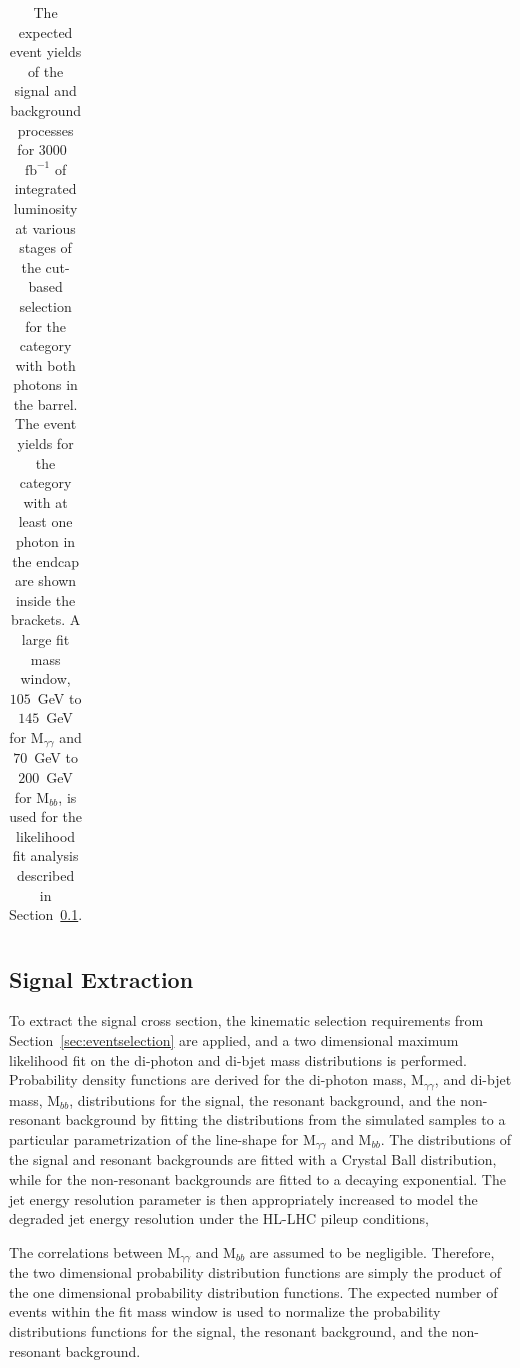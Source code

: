 \begin{table}[!ht]
\begin{center}
{\begin{tabular}{|c|c|c|c|c|c|}
\end{tabular}
}
\caption{ The expected event yields of the signal and background processes
for $3000$~$\mathrm{fb}^{-1}$ of integrated luminosity at various stages of the cut-based selection for 
the category with both photons in the barrel. The event yields for the category with at least one photon in the endcap are shown inside the brackets. A large fit mass
window, $105$~GeV to $145$~GeV for $\mathrm{M}_{\gamma\gamma}$ and $70$~GeV to $200$~GeV for $\mathrm{M}_{bb}$,
is used for the likelihood fit analysis described in Section~\ref{sec:signalextraction}. }
\label{tab:EventYields}
\end{center}
\end{table}


\subsection{Signal Extraction}
\label{sec:signalextraction}

To extract the signal cross section, the kinematic selection requirements from Section~\ref{sec:eventselection} are applied, and a two dimensional maximum
likelihood fit on the di-photon and di-bjet mass distributions is performed. Probability density functions are derived for the di-photon mass, $\mathrm{M}_{\gamma\gamma}$, and di-bjet mass, $\mathrm{M}_{bb}$,
distributions for the signal, the resonant background, and the non-resonant background by 
fitting the distributions from the simulated samples to a particular parametrization 
of the line-shape for $\mathrm{M}_{\gamma\gamma}$ and $\mathrm{M}_{bb}$. The distributions of the signal and resonant backgrounds are fitted with a Crystal Ball distribution, while for
the non-resonant backgrounds are fitted to a decaying exponential. The jet energy resolution parameter is then appropriately increased to model the degraded jet energy resolution under the HL-LHC pileup conditions,

The correlations between $\mathrm{M}_{\gamma\gamma}$ and $\mathrm{M}_{bb}$ are assumed to be negligible. Therefore, the two dimensional probability distribution functions are simply the product of the one dimensional probability distribution functions. The expected number of events within the fit mass window is used to normalize the probability distributions functions for the signal, the resonant background, and the non-resonant background. 

